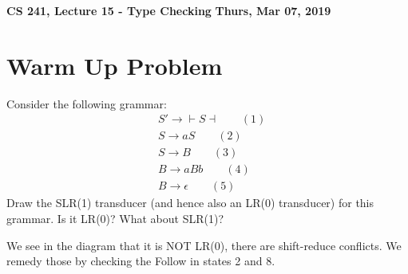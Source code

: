 \documentclass[12pt]{article}
\author{Clement Tsang}
\begin{document}
\begin{center}
\Large\textbf{CS 241, Lecture 15 - Type Checking}
\textbf{Thurs, Mar 07, 2019}
\end{center}

\section{Warm Up Problem}
Consider the following grammar:
\begin{align*}
    &S' \rightarrow \vdash S \dashv \qquad (1)\\
    &S \rightarrow aS \qquad (2)\\
    &S \rightarrow B \qquad (3)\\
    &B \rightarrow aBb \qquad (4)\\
    &B \rightarrow \epsilon \qquad (5)
\end{align*}
Draw the SLR(1) transducer (and hence also an LR(0) transducer) for this grammar.  Is it LR(0)?  What about SLR(1)?

We see in the diagram that it is NOT LR(0), there are shift-reduce conflicts.  We remedy those by checking the Follow in states 2 and 8.
\end{document}
